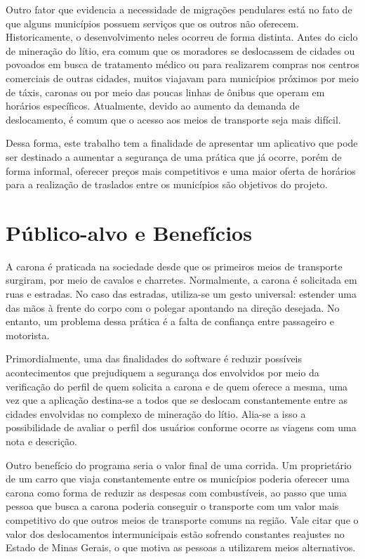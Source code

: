 Outro fator que evidencia a necessidade de migrações pendulares está no fato de que alguns municípios possuem serviços que os outros não oferecem. Historicamente, o desenvolvimento neles ocorreu de forma distinta. Antes do ciclo de mineração do lítio, era comum que os moradores se deslocassem de cidades ou povoados em busca de tratamento médico ou para realizarem compras nos centros comerciais de outras cidades, muitos viajavam para municípios próximos por meio de táxis, caronas ou por meio das poucas linhas de ônibus que operam em horários específicos. Atualmente, devido ao aumento da demanda de deslocamento, é comum que o acesso aos meios de transporte seja mais difícil. 

Dessa forma, este trabalho tem a finalidade de apresentar um aplicativo que pode ser destinado a aumentar a segurança de uma prática que já ocorre, porém de forma informal, oferecer preços mais competitivos e uma maior oferta de horários para a realização de traslados entre os municípios são objetivos do projeto.

\section{Público-alvo e Benefícios}

A carona é praticada na sociedade desde que os primeiros meios de transporte surgiram, por meio de cavalos e charretes. Normalmente, a carona é solicitada em ruas e estradas. No caso das estradas, utiliza-se um gesto universal: estender uma das mãos à frente do corpo com o polegar apontando na direção desejada. No entanto, um problema dessa prática é a falta de confiança entre passageiro e motorista.

Primordialmente, uma das finalidades do software é reduzir possíveis acontecimentos que prejudiquem a segurança dos envolvidos por meio da verificação do perfil de quem solicita a carona e de quem oferece a mesma, uma vez que a aplicação destina-se a todos que se deslocam constantemente entre as cidades envolvidas no complexo de mineração do lítio. Alia-se a isso a possibilidade de avaliar o perfil dos usuários conforme ocorre as viagens com uma nota e descrição. 

Outro benefício do programa seria o valor final de uma corrida. Um proprietário de um carro que viaja constantemente entre os municípios poderia oferecer uma carona como forma de reduzir as despesas com combustíveis, ao passo que uma pessoa que busca a carona poderia conseguir o transporte com um valor mais competitivo do que outros meios de transporte comuns na região. Vale citar que o valor dos deslocamentos intermunicipais estão sofrendo constantes reajustes no Estado de Minas Gerais, o que motiva as pessoas a utilizarem meios alternativos. 

